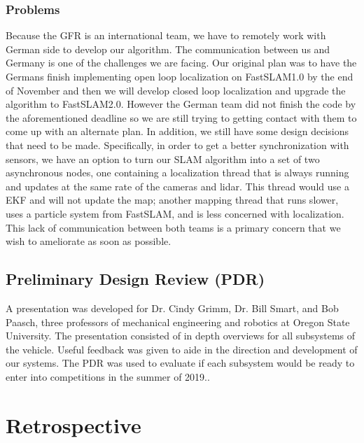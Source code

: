 \documentclass[10pt, onecolumn, draftclsnofoot, letterpaper,compsoc]{IEEEtran}
\begin{document}
\subsubsection{Problems}
Because the GFR is an international team, we have to remotely work with German side to develop our algorithm. The communication between us and Germany is one of the challenges we are facing. Our original plan was to have the Germans finish implementing open loop localization on FastSLAM1.0 by the end of November and then we will develop closed loop localization and upgrade the algorithm to FastSLAM2.0. However the German team did not finish the code by the aforementioned deadline so we are still trying to getting contact with them to come up with an alternate plan. In addition, we still have some design decisions that need to be made. Specifically, in order to get a better synchronization with sensors, we have an option to turn our SLAM algorithm into a set of two asynchronous nodes, one containing a localization thread that is always running and updates at the same rate of the cameras and lidar. This thread would use a EKF and will not update the map; another mapping thread that runs slower, uses a particle system from FastSLAM, and is less concerned with localization. This lack of communication between both teams is a primary concern that we wish to ameliorate as soon as possible.

\subsection{Preliminary Design Review (PDR)}
A presentation was developed for Dr. Cindy Grimm, Dr. Bill Smart, and Bob Paasch, three professors of mechanical engineering and robotics at Oregon State University. The presentation consisted of in depth overviews for all subsystems of the vehicle. Useful feedback was given to aide in the direction and development of our systems. The PDR was used to evaluate if each subsystem would be ready to enter into competitions in the summer of 2019.. 


\section{Retrospective}
\end{document}

